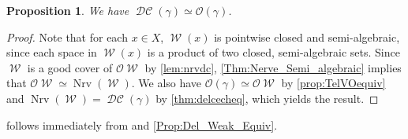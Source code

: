 \documentclass[11pt]{amsart}
\DeclareMathOperator{\Nrv}{Nrv}
\DeclareMathOperator{\TelDC}{\mathcal W}
\DeclareMathOperator{\DelCech}{\mathcal{DC}}
\newcommand{\Offset}[0]{\mathcal{O}}
\theoremstyle{plain}
\newtheorem{proposition}[theorem]{Proposition}
\theoremstyle{definition}
\theoremstyle{remark}
\begin{document}
%
\begin{proposition}\label{Prop:Del_Cech_Equivalence}
We have $\DelCech(\gamma)\simeq \Offset(\gamma)$.
\end{proposition}
%
\begin{proof}
Note that for each $x\in X$, $\TelDC(x)$ is pointwise closed and semi-algebraic, since each space in $\TelDC(x)$ is a product of two closed, semi-algebraic sets. Since $\TelDC$ is a good cover of $\mathcal O\TelDC$  by \cref{lem:nrvdc}, \cref{Thm:Nerve_Semi_algebraic} implies that $\mathcal O\TelDC\simeq  \Nrv(\TelDC)$.  We also have $\mathcal O(\gamma) \simeq \mathcal O\TelDC$ by \cref{prop:TelVOequiv} and $\Nrv(\TelDC)= \DelCech(\gamma)$ by \cref{thm:delcecheq}, which yields the result.  
\end{proof}
%
%
 follows immediately from  and \cref{Prop:Del_Weak_Equiv}.  
%
%
%
%
\end{document}
